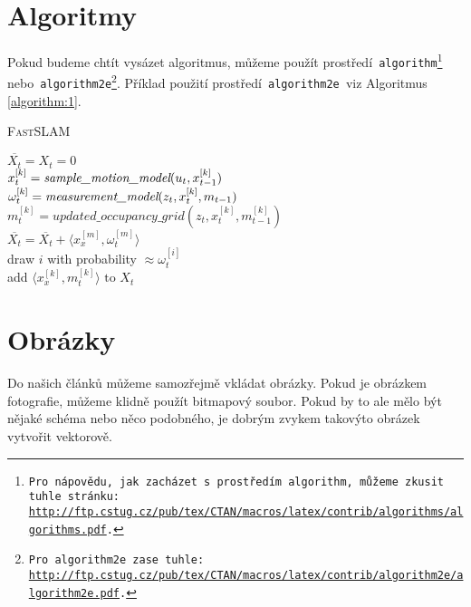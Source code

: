 \documentclass[a4paper, 11pt]{article}[23.3.2020]
\begin{document}
\pagebreak

\section{Algoritmy}\label{section:3}

Pokud budeme chtít vysázet algoritmus, můžeme použít prostředí\texttt{  algorithm\footnote{Pro nápovědu, jak zacházet s~prostředím\texttt{ algorithm,} můžeme zkusit tuhle stránku: \\  \url{http://ftp.cstug.cz/pub/tex/CTAN/macros/latex/contrib/algorithms/algorithms.pdf}.} } nebo\texttt{ algorithm2e\footnote{Pro\texttt{ algorithm2e }zase tuhle: \url{http://ftp.cstug.cz/pub/tex/CTAN/macros/latex/contrib/algorithm2e/algorithm2e.pdf}.}}. Příklad použití prostředí\texttt{ algorithm2e }viz Algoritmus \ref{algorithm:1}. \\
\IncMargin{1.5em}
\begin{algorithm}
	\caption{\textsc{FastSLAM}}\label{algorithm:1}
	\SetNlSty{}{}{:}
	\SetInd{1em}{1em}

	\Indm\Indmm
	\Indp\Indpp
	\BlankLine

	$\overline{X_t} = X_t = 0 $ \\
	 {
		$x_t^{[k]} = \emph{sample\_motion\_model}(u_t, x_{t - 1}^{[k]})$ \\
		$\omega_t^{[k]} = \emph{measurement\_model}(z_t, x_t^{[k]}, m_{t - 1})$ \\
		$m_t^{[k]} = updated\_occupancy\_grid(z_t, x_t^{[k]}, m_{t - 1}^{[k]})$ \\
		$\overline{X_t} = \overline{X_t} + \langle x_x^{[m]}, \omega_t^{[m]} \rangle$ \\}
	 {
		draw $i$ with probability $\approx \omega_t^{[i]}$ \\
		add $\langle x_x^{[k]}, m_t^{[k]} \rangle \textrm{ to } X_t$ \\}
\end{algorithm}
\DecMargin{1.5em}

\section{Obrázky}

Do našich článků můžeme samozřejmě vkládat obrázky. Pokud je obrázkem fotografie, můžeme klidně použít bitmapový soubor. Pokud by to ale mělo být nějaké schéma nebo něco podobného, je dobrým zvykem takovýto obrázek vytvořit vektorově.
\end{document}
